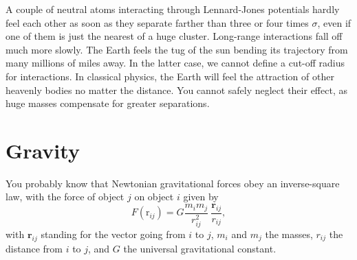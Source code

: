 A couple of neutral atoms interacting through Lennard-Jones potentials hardly 
feel each other as soon as they separate farther than three or four times 
$\sigma$, even if one of them is just the nearest of a huge cluster. Long-range 
interactions fall off much more slowly. The Earth feels the tug of the sun 
bending its trajectory from many millions of miles away. In the latter case, we 
cannot define a cut-off radius for interactions. In classical physics, the Earth 
will feel the attraction of other heavenly bodies no matter the distance. You 
cannot safely neglect their effect, as huge masses compensate for greater 
separations.

\section{Gravity}

You probably know that Newtonian gravitational forces obey an inverse-square
law, with the force of object $j$ on object $i$ given by
\begin{equation*}
  F(\mathrm{r}_{ij}) = G \frac{m_i m_j}{r_{ij}^2}\
                         \frac{\mathbf{r}_{ij}}{r_{ij}},
\end{equation*}
with $\mathbf{r}_{ij}$ standing for the vector going from $i$ to $j$, $m_i$ and
$m_j$ the masses, $r_{ij}$ the distance from $i$ to $j$, and $G$ the universal
gravitational constant.

